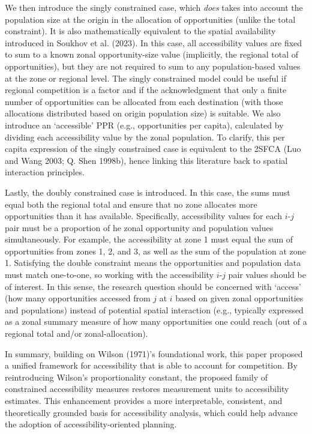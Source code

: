 \documentclass[
]{article}
\begin{document}
We then introduce the singly constrained case, which \emph{does} takes
into account the population size at the origin in the allocation of
opportunities (unlike the total constraint). It is also mathematically
equivalent to the spatial availability introduced in Soukhov et al.
(2023). In this case, all accessibility values are fixed to sum to a
known zonal opportunity-size value (implicitly, the regional total of
opportunities), but they are not required to sum to any population-based
values at the zone or regional level. The singly constrained model could
be useful if regional competition is a factor and if the acknowledgment
that only a finite number of opportunities can be allocated from each
destination (with those allocations distributed based on origin
population size) is suitable. We also introduce an `accessible' PPR
(e.g., opportunities per capita), calculated by dividing each
accessibility value by the zonal population. To clarify, this per capita
expression of the singly constrained case is equivalent to the 2SFCA
(Luo and Wang 2003; Q. Shen 1998b), hence linking this literature back
to spatial interaction principles.

Lastly, the doubly constrained case is introduced. In this case, the
sums must equal both the regional total and ensure that no zone
allocates more opportunities than it has available. Specifically,
accessibility values for each \(i\)-\(j\) pair must be a proportion of
he zonal opportunity and population values simultaneously. For example,
the accessibility at zone 1 must equal the sum of opportunities from
zones 1, 2, and 3, as well as the sum of the population at zone 1.
Satisfying the double constraint means the opportunities and population
data must match one-to-one, so working with the accessibility
\(i\)-\(j\) pair values should be of interest. In this sense, the
research question should be concerned with `access' (how many
opportunities accessed from \(j\) at \(i\) based on given zonal
opportunities and populations) instead of potential spatial interaction
(e.g., typically expressed as a zonal summary measure of how many
opportunities one could reach (out of a regional total and/or
zonal-allocation).

In summary, building on Wilson (1971)'s foundational work, this paper
proposed a unified framework for accessibility that is able to account
for competition. By reintroducing Wilson's proportionality constant, the
proposed family of constrained accessibility measures restores
measurement units to accessibility estimates. This enhancement provides
a more interpretable, consistent, and theoretically grounded basis for
accessibility analysis, which could help advance the adoption of
accessibility-oriented planning.
\end{document}
